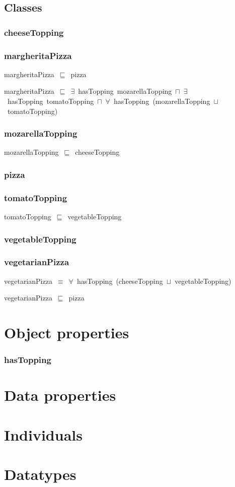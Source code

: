 \documentclass{article}
\begin{document}
\subsection*{Classes}

\subsubsection*{cheeseTopping}

\subsubsection*{margheritaPizza}

margheritaPizza~\ensuremath{\sqsubseteq}~pizza~

margheritaPizza~\ensuremath{\sqsubseteq}~\ensuremath{\exists}~hasTopping~mozarellaTopping~\ensuremath{\sqcap}~\ensuremath{\exists}~hasTopping~tomatoTopping~\ensuremath{\sqcap}~\ensuremath{\forall}~hasTopping~(mozarellaTopping~\ensuremath{\sqcup}~tomatoTopping)~

\subsubsection*{mozarellaTopping}

mozarellaTopping~\ensuremath{\sqsubseteq}~cheeseTopping~

\subsubsection*{pizza}

\subsubsection*{tomatoTopping}

tomatoTopping~\ensuremath{\sqsubseteq}~vegetableTopping~

\subsubsection*{vegetableTopping}

\subsubsection*{vegetarianPizza}

vegetarianPizza~\ensuremath{\equiv}~\ensuremath{\forall}~hasTopping~(cheeseTopping~\ensuremath{\sqcup}~vegetableTopping)

vegetarianPizza~\ensuremath{\sqsubseteq}~pizza~

\section*{Object properties}\subsubsection*{hasTopping}

\section*{Data properties}\section*{Individuals}\section*{Datatypes}
\end{document}
